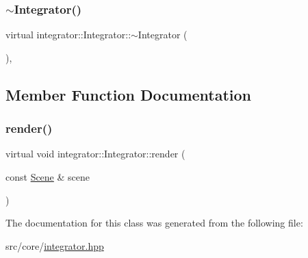 \subsubsection{\texorpdfstring{$\sim$Integrator()}{~Integrator()}}
{\footnotesize\ttfamily virtual integrator\+::\+Integrator\+::$\sim$\+Integrator (\begin{DoxyParamCaption}{ }\end{DoxyParamCaption})\hspace{0.3cm}{\ttfamily [inline]}, {\ttfamily [virtual]}}



\subsection{Member Function Documentation}
\mbox{\label{classintegrator_1_1Integrator_a02a7bb9b04ac6f28eb8adb4d48eed770}} 
\subsubsection{\texorpdfstring{render()}{render()}}
{\footnotesize\ttfamily virtual void integrator\+::\+Integrator\+::render (\begin{DoxyParamCaption}\item[{const \mbox{\hyperlink{classScene}{Scene}} \&}]{scene }\end{DoxyParamCaption})\hspace{0.3cm}{\ttfamily [pure virtual]}}



The documentation for this class was generated from the following file\+:\begin{DoxyCompactItemize}
\item 
src/core/\mbox{\hyperlink{integrator_8hpp}{integrator.\+hpp}}\end{DoxyCompactItemize}
